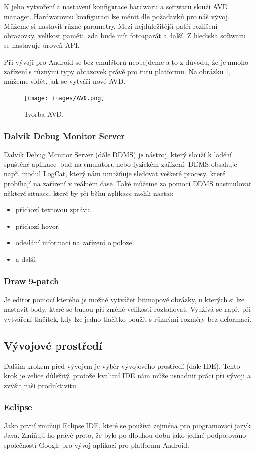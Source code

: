 \documentclass[12pt]{article}
\begin{document}
K jeho vytvoření a nastavení konfigurace hardwaru a softwaru slouží AVD manager. Hardwarovou konfiguraci lze měnit dle požadavků pro náš vývoj. Můžeme si nastavit různé parametry. Mezi nejdůležitější patří rozlišení obrazovky, velikost paměti, zda bude mít fotoaparát a další. Z hlediska softwaru se nastavuje úroveň API.

Při vývoji pro Android se bez emulátorů neobejdeme a to z důvodu, že je mnoho zařízení s různými typy obrazovek právě pro tutu platformu. Na obrázku \ref{avd}, můžeme vidět, jak se vytváří nové AVD.
\newpage
\begin{figure}[ht]
\centerline{\texttt{[image: images/AVD.png]}}
\caption{Tvorba AVD.} \label{avd}
\end{figure}

\subsubsection{Dalvik Debug Monitor Server}
Dalvik Debug Monitor Server (dále DDMS) je nástroj, který slouží k ladění spuštěné aplikace, buď na emulátoru nebo fyzickém zařízení. DDMS obsahuje např. modul LogCat, který nám umožňuje sledovat veškeré procesy, které probíhají na zařízení v reálném čase. Také můžeme za pomocí DDMS nasimulovat některé situace, které by při běhu aplikace mohli nastat:
\begin{itemize}
\item příchozí textovou zprávu.
\item příchozí hovor.
\item odeslání informací na zařízení o poloze.
\item a další.
\end{itemize}
\subsubsection{Draw 9-patch}
Je editor pomocí kterého je možné vytvářet bitmapové obrázky, u kterých si lze nastavit body, které se budou při změně velikosti roztahovat. Využívá se např. při vytváření tlačítek, kdy lze jedno tlačítko použít s různými rozměry bez deformací.
\subsection{Vývojové prostředí}
Dalším krokem před vývojem je výběr vývojového prostředí (dále IDE). Tento krok je velice důležitý, protože kvalitní IDE nám může usnadnit práci při vývoji a zvýšit naši produktivitu.
\subsubsection{Eclipse}
Jako první zmiňuji Eclipse IDE, které se používá zejména pro programovací jazyk Java. Zmiňuji ho právě proto, že bylo po dlouhou dobu jako jediné podporováno společností Google pro vývoj aplikací pro platformu Android.
\end{document}
